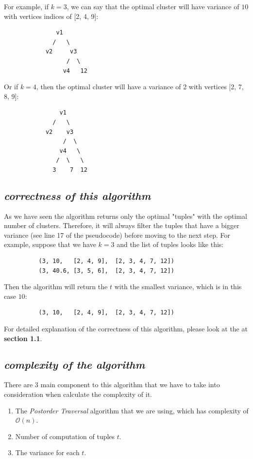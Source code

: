 \documentclass[11pt,a4paper,english]{article}
\begin{document}
        For example, if $k=3$, we can say that the optimal cluster will have variance of $10$ with vertices indices of [2, 4, 9]:
        \begin{verbatim}
               v1
              /   \
            v2     v3
                  /  \
                 v4   12
        \end{verbatim}

        Or if $k=4$, then the optimal cluster will have a variance of 2 with vertices [2, 7, 8, 9]:
        \begin{verbatim}
                v1
              /   \
            v2    v3
                 /  \
                v4   \
               /  \   \
              3    7  12
        \end{verbatim}

      \subsection{
        \textit{correctness of this algorithm}
      }
        As we have seen the algorithm returns only the optimal "tuples" with the optimal number of clusters. Therefore, it will always filter the tuples that have a bigger variance (see line 17 of the pseudocode) before moving to the next step. For example, suppose that we have $k=3$ and the list of tuples looks like this:
        \begin{verbatim}
          (3, 10,   [2, 4, 9],  [2, 3, 4, 7, 12])
          (3, 40.6, [3, 5, 6],  [2, 3, 4, 7, 12])
        \end{verbatim}
        Then the algorithm will return the $t$ with the smallest variance, which is in this case $10$:
        \begin{verbatim}
          (3, 10,   [2, 4, 9],  [2, 3, 4, 7, 12])
        \end{verbatim}

        For detailed explanation of the correctness of this algorithm, please look at the at \textbf{section 1.1}.

      \subsection{
        \textit{complexity of the algorithm}
      }
        There are 3 main component to this algorithm that we have to take into consideration when calculate the complexity of it.
        \begin{enumerate}
          \item The \textit{Postorder Traversal} algorithm that we are using, which has complexity of $\mathcal{O}(n)$.
          \item Number of computation of tuples $t$.
          \item The variance for each $t$.
        \end{enumerate}
\end{document}
